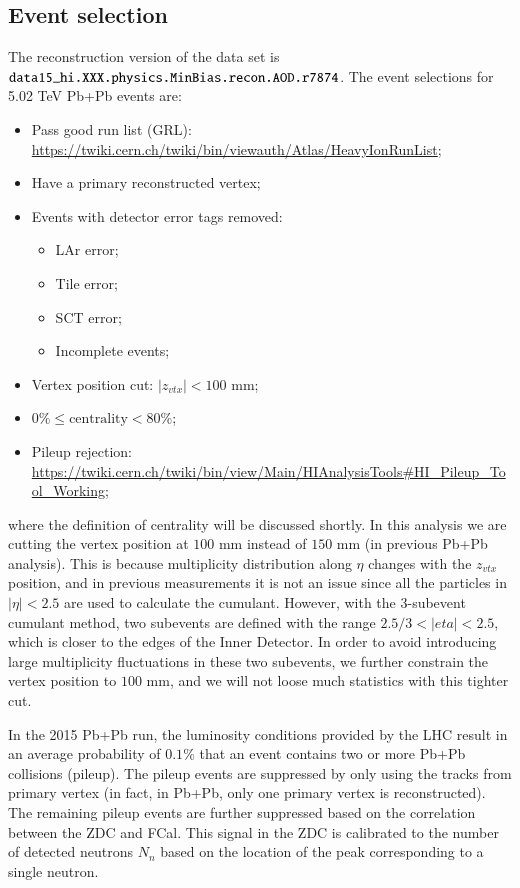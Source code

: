 \subsection{Event selection}
The reconstruction version of the data set is $\verb|data15_hi.XXX.physics.MinBias.recon.AOD.r7874|$. The event selections for 5.02 TeV Pb+Pb events are:
\begin{itemize}
\item Pass good run list (GRL): \url{https://twiki.cern.ch/twiki/bin/viewauth/Atlas/HeavyIonRunList};
\item Have a primary reconstructed vertex;
\item Events with detector error tags removed:
\begin{itemize}
\item LAr error;
\item Tile error;
\item SCT error;
\item Incomplete events;
\end{itemize}
\item Vertex position cut: $|z_{vtx}|<100$ mm;
\item $0\%\leq\text{centrality}<80\%$;
\item Pileup rejection: \url{https://twiki.cern.ch/twiki/bin/view/Main/HIAnalysisTools#HI\_Pileup\_Tool\_Working};
\end{itemize}
where the definition of centrality will be discussed shortly. In this analysis we are cutting the vertex position at $100$ mm instead of $150$ mm (in previous Pb+Pb analysis). This is because multiplicity distribution along $\eta$ changes with the $z_{vtx}$ position, and in previous measurements it is not an issue since all the particles in $|\eta|<2.5$ are used to calculate the cumulant. However, with the 3-subevent cumulant method, two subevents are defined with the range $2.5/3<|eta|<2.5$, which is closer to the edges of the Inner Detector. In order to avoid introducing large multiplicity fluctuations in these two subevents, we further constrain the vertex position to $100$ mm, and we will not loose much statistics with this tighter cut.

In the 2015 Pb+Pb run, the luminosity conditions provided by the LHC result in an average probability of $0.1\%$ that an event contains two or more Pb+Pb collisions (pileup). The pileup events are suppressed by only using the tracks from primary vertex (in fact, in Pb+Pb, only one primary vertex is reconstructed). The remaining pileup events are further suppressed based on the correlation between the ZDC and FCal. This signal in the ZDC is calibrated to the number of detected neutrons $N_n$ based on the location of the peak corresponding to a single neutron.

